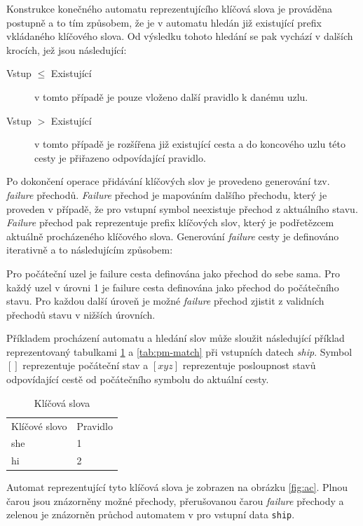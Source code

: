 Konstrukce konečného automatu reprezentujícího klíčová slova je prováděna postupně a to tím způsobem,
že je v automatu hledán již existující prefix vkládaného klíčového slova. Od výsledku tohoto hledání
se pak vychází v dalších krocích, jež jsou následující:

\begin{description}
    \item[Vstup  $\leq$ Existující] v tomto případě je pouze vloženo další pravidlo k danému uzlu.
    \item[Vstup $>$ Existující] v tomto případě je rozšířena již existující cesta a do koncového
    uzlu této cesty je přiřazeno odpovídající pravidlo.
\end{description}

Po dokončení operace přidávání klíčových slov je provedeno generování tzv. \textit{failure} přechodů.
\textit{Failure} přechod je mapováním dalšího přechodu, který je proveden v případě, že pro vstupní symbol neexistuje
přechod z aktuálního stavu. \textit{Failure} přechod pak reprezentuje prefix klíčových slov,
který je podřetězcem aktuálně procházeného klíčového slova.
Generování \textit{failure} cesty je definováno iterativně a to následujícím způsobem:

Pro počáteční uzel je failure cesta definována jako přechod do sebe sama.
Pro každý uzel v úrovni 1 je failure cesta definována jako přechod do počátečního stavu.
Pro každou další úroveň je možné \textit{failure} přechod zjistit z validních přechodů stavu v nižších úrovních.

Příkladem procházení automatu a hledání slov může sloužit následující příklad reprezentovaný tabulkami
\ref{tab:pm-keywords} a \ref{tab:pm-match} při vstupních datech \textit{ship}.
Symbol $[]$ reprezentuje počáteční stav a $[xyz]$ reprezentuje posloupnost stavů odpovídající cestě od
počátečního symbolu do aktuální cesty.

\begin{table}[!htbp]
    \center
    \begin{tabular}{|l|l|}
    \hline
    Klíčové slovo & Pravidlo \\ \hhline{|=|=|}
    she & 1  \\ \hline
    hi & 2 \\ \hline
    \end{tabular}
    \caption{Klíčová slova}
    \label{tab:pm-keywords}
\end{table}

Automat reprezentující tyto klíčová slova je zobrazen na obrázku \ref{fig:ac}.
Plnou čarou jsou znázorněny možné přechody, přerušovanou čarou \textit{failure} přechody a zelenou
je znázorněn průchod automatem v pro vstupní data \texttt{ship}.


